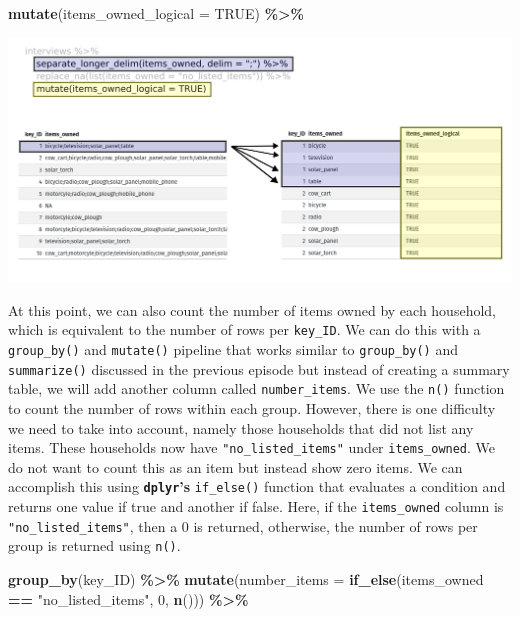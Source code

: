 \documentclass[
]{article}
\newenvironment{Shaded}{\begin{snugshade}}{\end{snugshade}}
\newcommand{\AttributeTok}[1]{\textcolor[rgb]{0.13,0.29,0.53}{#1}}
\newcommand{\ConstantTok}[1]{\textcolor[rgb]{0.56,0.35,0.01}{#1}}
\newcommand{\DecValTok}[1]{\textcolor[rgb]{0.00,0.00,0.81}{#1}}
\newcommand{\FunctionTok}[1]{\textcolor[rgb]{0.13,0.29,0.53}{\textbf{#1}}}
\newcommand{\NormalTok}[1]{#1}
\newcommand{\SpecialCharTok}[1]{\textcolor[rgb]{0.81,0.36,0.00}{\textbf{#1}}}
\newcommand{\StringTok}[1]{\textcolor[rgb]{0.31,0.60,0.02}{#1}}
\begin{document}
\begin{Shaded}
\begin{Highlighting}[]
\FunctionTok{mutate}\NormalTok{(}\AttributeTok{items\_owned\_logical =} \ConstantTok{TRUE}\NormalTok{) }\SpecialCharTok{\%\textgreater{}\%}
\end{Highlighting}
\end{Shaded}

\includegraphics{fig/separate_longer.png}

At this point, we can also count the number of items owned by each
household, which is equivalent to the number of rows per
\texttt{key\_ID}. We can do this with a \texttt{group\_by()} and
\texttt{mutate()} pipeline that works similar to \texttt{group\_by()}
and \texttt{summarize()} discussed in the previous episode but instead
of creating a summary table, we will add another column called
\texttt{number\_items}. We use the \texttt{n()} function to count the
number of rows within each group. However, there is one difficulty we
need to take into account, namely those households that did not list any
items. These households now have \texttt{"no\_listed\_items"} under
\texttt{items\_owned}. We do not want to count this as an item but
instead show zero items. We can accomplish this using
\textbf{\texttt{dplyr}'s} \texttt{if\_else()} function that evaluates a
condition and returns one value if true and another if false. Here, if
the \texttt{items\_owned} column is \texttt{"no\_listed\_items"}, then a
0 is returned, otherwise, the number of rows per group is returned using
\texttt{n()}.

\begin{Shaded}
\begin{Highlighting}[]
\FunctionTok{group\_by}\NormalTok{(key\_ID) }\SpecialCharTok{\%\textgreater{}\%} 
  \FunctionTok{mutate}\NormalTok{(}\AttributeTok{number\_items =} \FunctionTok{if\_else}\NormalTok{(items\_owned }\SpecialCharTok{==} \StringTok{"no\_listed\_items"}\NormalTok{, }\DecValTok{0}\NormalTok{, }\FunctionTok{n}\NormalTok{())) }\SpecialCharTok{\%\textgreater{}\%} 
\end{Highlighting}
\end{Shaded}
\end{document}
